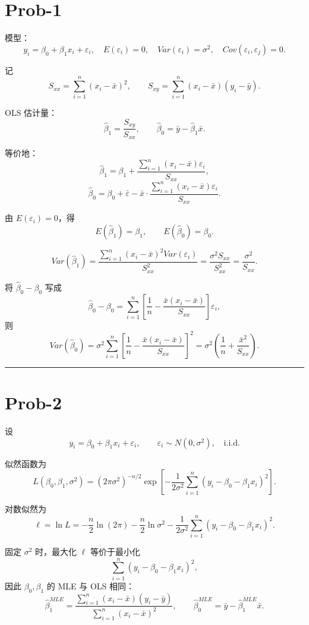 \documentclass[12pt,a4paper]{ctexart}
\newcommand{\answer}{\par\vspace{0.5em}\noindent\rule{\linewidth}{0.4pt}\par\vspace{1em}}
\begin{document}
\section*{Prob-1}

模型：
\[
y_i = \beta_0 + \beta_1 x_i + \varepsilon_i,\quad
E(\varepsilon_i)=0,\quad Var(\varepsilon_i)=\sigma^2,\quad Cov(\varepsilon_i,\varepsilon_j)=0.
\]

记
\[
S_{xx}=\sum_{i=1}^n (x_i-\bar{x})^2,\qquad
S_{xy}=\sum_{i=1}^n (x_i-\bar{x})(y_i-\bar{y}).
\]

OLS 估计量：
\[
\hat{\beta}_1=\frac{S_{xy}}{S_{xx}},\qquad
\hat{\beta}_0=\bar{y}-\hat{\beta}_1\bar{x}.
\]

等价地：
\[
\hat{\beta}_1=\beta_1+\frac{\sum_{i=1}^n (x_i-\bar{x})\varepsilon_i}{S_{xx}},
\]
\[
\hat{\beta}_0=\beta_0+\bar{\varepsilon}-\bar{x}\cdot
\frac{\sum_{i=1}^n (x_i-\bar{x})\varepsilon_i}{S_{xx}}.
\]

由 \(E(\varepsilon_i)=0\)，得
\[
E(\hat{\beta}_1)=\beta_1,\qquad E(\hat{\beta}_0)=\beta_0.
\]

\[
Var(\hat{\beta}_1)
=\frac{\sum_{i=1}^n (x_i-\bar{x})^2 Var(\varepsilon_i)}{S_{xx}^2}
=\frac{\sigma^2 S_{xx}}{S_{xx}^2}
=\frac{\sigma^2}{S_{xx}}.
\]

将 \(\hat{\beta}_0-\beta_0\) 写成
\[
\hat{\beta}_0-\beta_0=
\sum_{i=1}^n \left[
\frac{1}{n}-\frac{\bar{x}(x_i-\bar{x})}{S_{xx}}
\right]\varepsilon_i,
\]
则
\[
Var(\hat{\beta}_0)
=\sigma^2\sum_{i=1}^n
\left[
\frac{1}{n}-\frac{\bar{x}(x_i-\bar{x})}{S_{xx}}
\right]^2
=\sigma^2\left(\frac{1}{n}+\frac{\bar{x}^2}{S_{xx}}\right).
\]

\answer

\section*{Prob-2}
设
\[
y_i=\beta_0+\beta_1 x_i+\varepsilon_i,\qquad
\varepsilon_i\sim N(0,\sigma^2),\quad \text{i.i.d.}
\]

似然函数为
\[
L(\beta_0,\beta_1,\sigma^2)
=(2\pi\sigma^2)^{-n/2}
\exp\left[-\frac{1}{2\sigma^2}
\sum_{i=1}^n (y_i-\beta_0-\beta_1 x_i)^2\right].
\]

对数似然为
\[
\ell=\ln L
=-\frac{n}{2}\ln(2\pi)
-\frac{n}{2}\ln\sigma^2
-\frac{1}{2\sigma^2}
\sum_{i=1}^n (y_i-\beta_0-\beta_1 x_i)^2.
\]

固定 \(\sigma^2\) 时，最大化 \(\ell\) 等价于最小化
\[
\sum_{i=1}^n (y_i-\beta_0-\beta_1 x_i)^2,
\]
因此 \(\beta_0,\beta_1\) 的 MLE 与 OLS 相同：
\[
\hat{\beta}_1^{MLE}
=\frac{\sum_{i=1}^n (x_i-\bar{x})(y_i-\bar{y})}
{\sum_{i=1}^n (x_i-\bar{x})^2},
\qquad
\hat{\beta}_0^{MLE}=\bar{y}-\hat{\beta}_1^{MLE}\bar{x}.
\]
\end{document}
